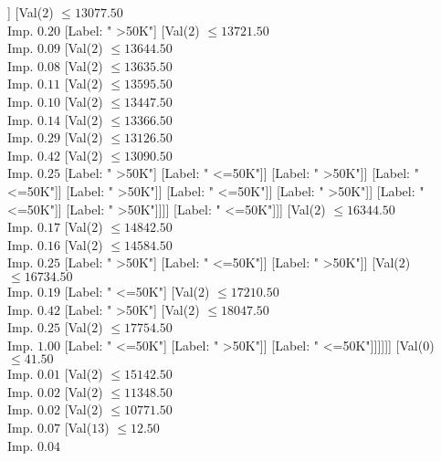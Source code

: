\documentclass[margin=10pt]{standalone}
\begin{document}
\begin{forest}
												[Label: " <=50K"]]
											[Val($2$) $ \leq 13077.50$ \\ Imp. $0.20$
												[Label: " >50K"]
												[Val($2$) $ \leq 13721.50$ \\ Imp. $0.09$
													[Val($2$) $ \leq 13644.50$ \\ Imp. $0.08$
														[Val($2$) $ \leq 13635.50$ \\ Imp. $0.11$
															[Val($2$) $ \leq 13595.50$ \\ Imp. $0.10$
																[Val($2$) $ \leq 13447.50$ \\ Imp. $0.14$
																	[Val($2$) $ \leq 13366.50$ \\ Imp. $0.29$
																		[Val($2$) $ \leq 13126.50$ \\ Imp. $0.42$
																			[Val($2$) $ \leq 13090.50$ \\ Imp. $0.25$
																				[Label: " >50K"]
																				[Label: " <=50K"]]
																			[Label: " >50K"]]
																		[Label: " <=50K"]]
																	[Label: " >50K"]]
																[Label: " <=50K"]]
															[Label: " >50K"]]
														[Label: " <=50K"]]
													[Label: " >50K"]]]]
										[Label: " <=50K"]]]
								[Val($2$) $ \leq 16344.50$ \\ Imp. $0.17$
									[Val($2$) $ \leq 14842.50$ \\ Imp. $0.16$
										[Val($2$) $ \leq 14584.50$ \\ Imp. $0.25$
											[Label: " >50K"]
											[Label: " <=50K"]]
										[Label: " >50K"]]
									[Val($2$) $ \leq 16734.50$ \\ Imp. $0.19$
										[Label: " <=50K"]
										[Val($2$) $ \leq 17210.50$ \\ Imp. $0.42$
											[Label: " >50K"]
											[Val($2$) $ \leq 18047.50$ \\ Imp. $0.25$
												[Val($2$) $ \leq 17754.50$ \\ Imp. $1.00$
													[Label: " <=50K"]
													[Label: " >50K"]]
												[Label: " <=50K"]]]]]]
							[Val($0$) $ \leq 41.50$ \\ Imp. $0.01$
								[Val($2$) $ \leq 15142.50$ \\ Imp. $0.02$
									[Val($2$) $ \leq 11348.50$ \\ Imp. $0.02$
										[Val($2$) $ \leq 10771.50$ \\ Imp. $0.07$
											[Val($13$) $ \leq 12.50$ \\ Imp. $0.04$

\end{forest}
\end{document}
